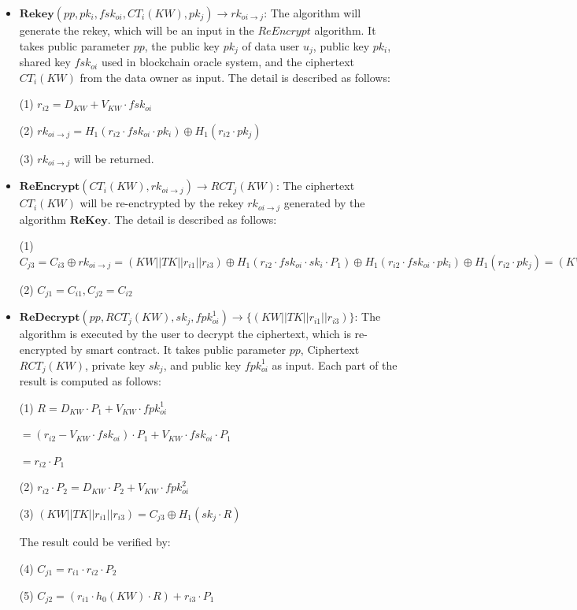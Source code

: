 \documentclass[journal]{IEEEtran}
\begin{document}
\begin{itemize}
    \item $ \boldsymbol{Rekey}(pp, pk_i, fsk_{oi}, CT_i(KW), pk_j) \to rk_{oi \to j}$: The algorithm will generate the rekey, which will be an input in the $ReEncrypt$ algorithm. It takes public parameter $pp$, the public key $pk_j$ of data user $u_j$, public key $pk_i$, shared key $fsk_{oi}$ used in blockchain oracle system, and the ciphertext $CT_i(KW)$ from the data owner as input.
    The detail is described as follows:
    
    (1) $r_{i2} = D_{KW} + V_{KW} \cdot fsk_{oi}$
    
    (2) $rk_{oi \to j} = H_1(r_{i2} \cdot fsk_{oi} \cdot pk_i) \oplus H_1(r_{i2} \cdot pk_j)$
    
    (3) $rk_{oi \to j}$ will be returned.
    
    \item $ \boldsymbol{ReEncrypt}(CT_i(KW), rk_{oi \to j}) \to RCT_j(KW)$:
    The ciphertext $CT_i(KW)$ will be re-enctrypted by the rekey $rk_{oi \to j}$ generated by the algorithm $\boldsymbol{ReKey}$.
    The detail is described as follows:
    
    (1) $C_{j3} = C_{i3} \oplus rk_{oi \to j} = (KW||TK||r_{i1}||r_{i3}) \oplus  H_1(r_{i2} \cdot fsk_{oi} \cdot sk_i \cdot P_1) \oplus H_1(r_{i2} \cdot fsk_{oi} \cdot pk_i) \oplus H_1(r_{i2} \cdot pk_j)  = (KW||TK||r_{i1}||r_{i3}) \oplus H_1(r_{i2} \cdot pk_j)$
    
    (2) $C_{j1} = C_{i1}, C_{j2} = C_{i2}$
\end{itemize}

\begin{itemize}
    \item $ \boldsymbol{ReDecrypt}(pp, RCT_j(KW), sk_{j}, fpk_{oi}^1) \to \{(KW||TK||r_{i1}||r_{i3})\} $: The algorithm is executed by the user to decrypt the ciphertext, which is re-encrypted by smart contract.
    It takes public parameter $pp$, Ciphertext $RCT_j(KW)$, private key $sk_{j}$, and public key $fpk_{oi}^1$ as input. Each part of the result is computed as follows: 
    
    (1) $R = D_{KW} \cdot P_1 + V_{KW} \cdot fpk_{oi}^1$
    
    $= (r_{i2} - V_{KW} \cdot fsk_{oi}) \cdot P_1 + V_{KW} \cdot fsk_{oi} \cdot P_1$
    
    $= r_{i2} \cdot P_1$
    
    (2) $r_{i2} \cdot P_2  = D_{KW} \cdot P_2 + V_{KW} \cdot fpk_{oi}^2$
    
    (3) $(KW||TK||r_{i1}||r_{i3}) = C_{j3} \oplus H_1(sk_j \cdot R)$
    
    The result could be verified by: 
    
    (4) $C_{j1} = r_{i1} \cdot r_{i2} \cdot P_2$
    
    (5) $C_{j2} = (r_{i1} \cdot h_0(KW) \cdot R) + r_{i3} \cdot P_1$
\end{itemize}
\end{document}
